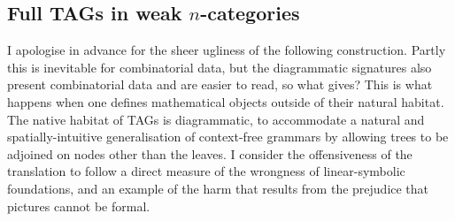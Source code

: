 \clearpage

\subsection{Full TAGs in weak $n$-categories}

I apologise in advance for the sheer ugliness of the following construction. Partly this is inevitable for combinatorial data, but the diagrammatic signatures also present combinatorial data and are easier to read, so what gives? This is what happens when one defines mathematical objects outside of their natural habitat. The native habitat of TAGs is diagrammatic, to accommodate a natural and spatially-intuitive generalisation of context-free grammars by allowing trees to be adjoined on nodes other than the leaves. I consider the offensiveness of the translation to follow a direct measure of the wrongness of linear-symbolic foundations, and an example of the harm that results from the prejudice that pictures cannot be formal.

